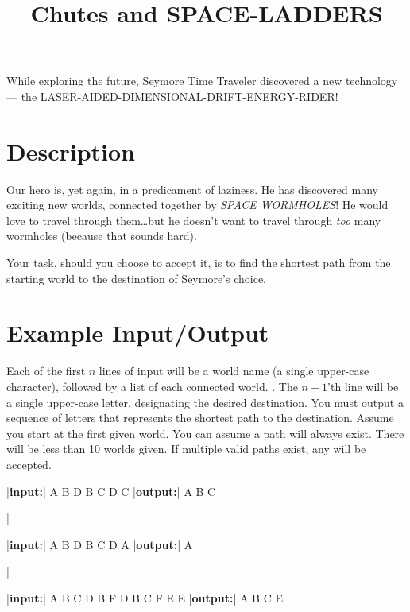 \documentclass{../codeproblem}
\begin{document}
\title{Chutes and SPACE-LADDERS}

\begin{flavor}
  While exploring the future, Seymore Time Traveler discovered a new
  technology --- the LASER-AIDED-DIMENSIONAL-DRIFT-ENERGY-RIDER!
\end{flavor}

\section*{Description}
Our hero is, yet again, in a predicament of laziness. He has discovered
many exciting new worlds, connected together by \emph{SPACE WORMHOLES}! He
would love to travel through them\ldots but he doesn't want to travel
through \emph{too} many wormholes (because that sounds hard).

Your task, should you choose to accept it, is to find the shortest
path from the starting world to the destination of Seymore's choice.

\section*{Example Input/Output}

Each of the first $n$ lines of input will be a world name (a single
upper-case character), followed by a list of each connected world. 
. The $n+1$'th line will be a single upper-case
letter, designating the desired destination. You must output a
sequence of letters that represents the shortest path to the
destination. Assume you start at the first given world. You can assume
a path will always exist. There will be less than 10 worlds given.
If multiple valid paths exist, any will be accepted.


\begin{minipage}{.33\linewidth}
  \begin{example}
|\textbf{input:}|
A B D
B C D
C
|\textbf{output:}|
A B C


|\end{example}
\end{minipage}
\begin{minipage}{.33\linewidth}
\begin{example}
|\textbf{input:}|
A B D
B C D
A
|\textbf{output:}|
A


|\end{example}
\end{minipage}
\begin{minipage}{.33\linewidth}
\begin{example}
|\textbf{input:}|
A B C D
B F
D B C
F E
E
|\textbf{output:}|
A B C E
|\end{example}
\end{minipage}
\end{document}
